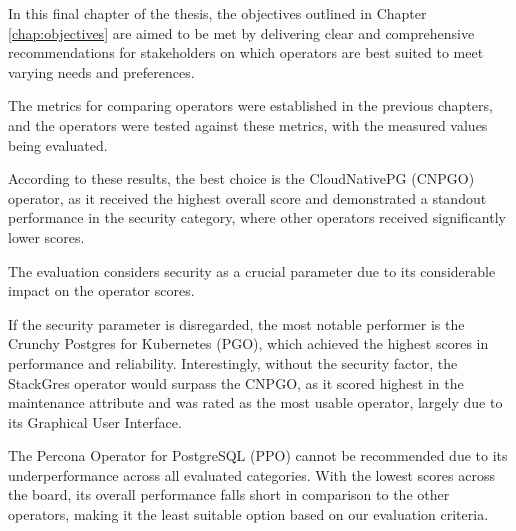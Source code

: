 

In this final chapter of the thesis, the objectives outlined in Chapter \ref{chap:objectives} are aimed to be met by delivering clear and comprehensive recommendations for stakeholders on which operators are best suited to meet varying needs and preferences.

The metrics for comparing operators were established in the previous chapters, and the operators were tested against these metrics, with the measured values being evaluated.

According to these results, the best choice is the CloudNativePG (CNPGO) operator, as it received the highest overall score and demonstrated a standout performance in the security category, where other operators received significantly lower scores.

The evaluation considers security as a crucial parameter due to its considerable impact on the operator scores.

If the security parameter is disregarded, the most notable performer is the Crunchy Postgres for Kubernetes (PGO), which achieved the highest scores in performance and reliability. Interestingly, without the security factor, the StackGres operator would surpass the CNPGO, as it scored highest in the maintenance attribute and was rated as the most usable operator, largely due to its Graphical User Interface.

The Percona Operator for PostgreSQL (PPO) cannot be recommended due to its underperformance across all evaluated categories. With the lowest scores across the board, its overall performance falls short in comparison to the other operators, making it the least suitable option based on our evaluation criteria.






